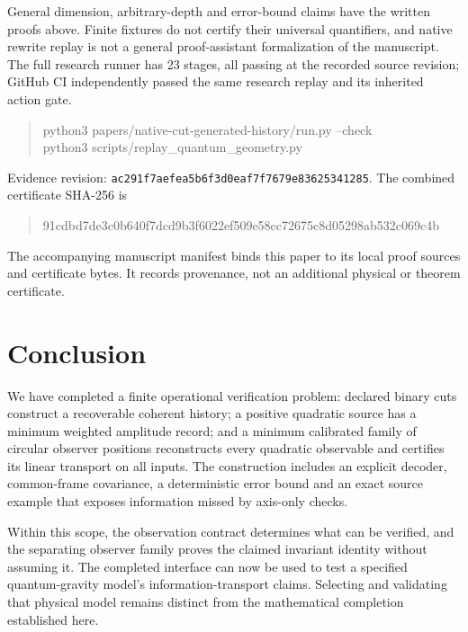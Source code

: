 \documentclass[11pt,a4paper]{article}
\begin{document}
General dimension, arbitrary-depth and error-bound claims have the written
proofs above. Finite fixtures do not certify their universal quantifiers,
and native rewrite replay is not a general proof-assistant formalization
of the manuscript. The full research runner has 23 stages, all passing at
the recorded source revision; GitHub CI independently passed the same
research replay and its inherited action gate.

\begin{quote}\small\ttfamily
python3 papers/native-cut-generated-history/run.py --check\\
python3 scripts/replay\_quantum\_geometry.py
\end{quote}

Evidence revision: \texttt{ac291f7aefea5b6f3d0eaf7f7679e83625341285}.
The combined certificate SHA-256 is
\begin{quote}\footnotesize\ttfamily
91cdbd7de3c0b640f7dcd9b3f6022ef509e58cc72675c8d05298ab532c069c4b
\end{quote}
The accompanying manuscript manifest binds this paper to its local proof
sources and certificate bytes. It records provenance, not an additional
physical or theorem certificate.

\section{Conclusion}

We have completed a finite operational verification problem: declared binary
cuts construct a recoverable coherent history; a positive quadratic source
has a minimum weighted amplitude record; and a minimum calibrated family
of circular observer positions reconstructs every quadratic observable and
certifies its linear transport on all inputs. The construction includes an
explicit decoder, common-frame covariance, a deterministic error bound and
an exact source example that exposes information missed by axis-only checks.

Within this scope, the observation contract determines what can be verified,
and the separating observer family proves the claimed invariant identity
without assuming it. The completed interface can now be used to test a
specified quantum-gravity model's information-transport claims. Selecting
and validating that physical model remains distinct from the mathematical
completion established here.
\end{document}
